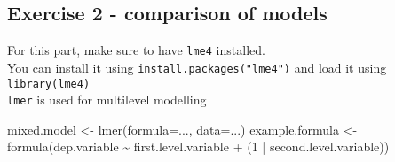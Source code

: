 \documentclass[
]{article}
\newenvironment{Shaded}{\begin{snugshade}}{\end{snugshade}}
\newcommand{\AttributeTok}[1]{\textcolor[rgb]{0.77,0.63,0.00}{#1}}
\newcommand{\DecValTok}[1]{\textcolor[rgb]{0.00,0.00,0.81}{#1}}
\newcommand{\FunctionTok}[1]{\textcolor[rgb]{0.00,0.00,0.00}{#1}}
\newcommand{\NormalTok}[1]{#1}
\newcommand{\OtherTok}[1]{\textcolor[rgb]{0.56,0.35,0.01}{#1}}
\newcommand{\SpecialCharTok}[1]{\textcolor[rgb]{0.00,0.00,0.00}{#1}}
\begin{document}
\hypertarget{exercise-2---comparison-of-models}{%
\subsection{Exercise 2 - comparison of
models}\label{exercise-2---comparison-of-models}}

For this part, make sure to have \texttt{lme4} installed.\\
You can install it using \texttt{install.packages("lme4")} and load it
using \texttt{library(lme4)}\\
\texttt{lmer} is used for multilevel modelling

\begin{Shaded}
\begin{Highlighting}[]
\NormalTok{mixed.model }\OtherTok{\textless{}{-}} \FunctionTok{lmer}\NormalTok{(}\AttributeTok{formula=}\NormalTok{..., }\AttributeTok{data=}\NormalTok{...)}
\NormalTok{example.formula }\OtherTok{\textless{}{-}} \FunctionTok{formula}\NormalTok{(dep.variable }\SpecialCharTok{\textasciitilde{}}\NormalTok{ first.level.variable }\SpecialCharTok{+}\NormalTok{ (}\DecValTok{1} \SpecialCharTok{|}\NormalTok{ second.level.variable))}
\end{Highlighting}
\end{Shaded}
\end{document}
